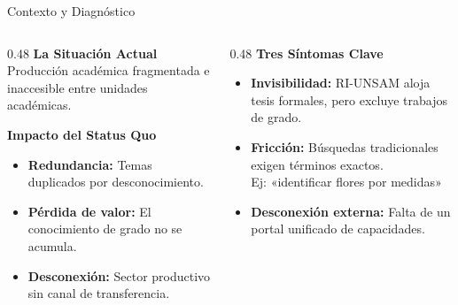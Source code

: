 \documentclass[11pt,aspectratio=169]{beamer}
\begin{document}
\begin{frame}{Contexto y Diagnóstico}
  \small
  \begin{columns}[T]
    \begin{column}{0.48\textwidth}
      {\headingfont\bfseries\color{brandlt}La Situación Actual}\\[0.05cm]
      Producción académica fragmentada e inaccesible entre unidades académicas.

      \vspace{0.12cm}
      {\headingfont\bfseries\color{brandlt}Impacto del Status Quo}\\[0.05cm]
      \begin{itemize}
        \item \textbf{Redundancia:} Temas duplicados por desconocimiento.
        \item \textbf{Pérdida de valor:} El conocimiento de grado no se acumula.
        \item \textbf{Desconexión:} Sector productivo sin canal de transferencia.
      \end{itemize}
    \end{column}

    \begin{column}{0.48\textwidth}
      {\headingfont\bfseries\color{brandlt}Tres Síntomas Clave}\\[0.05cm]
      \begin{itemize}
        \item \textbf{Invisibilidad:} RI-UNSAM aloja tesis formales, pero excluye trabajos de grado.
        \item \textbf{Fricción:} Búsquedas tradicionales exigen términos exactos.\\
        {\scriptsize\textcolor{soft}{Ej: «identificar flores por medidas»}}
        \item \textbf{Desconexión externa:} Falta de un portal unificado de capacidades.
      \end{itemize}
    \end{column}
  \end{columns}
\end{frame}

\end{document}
